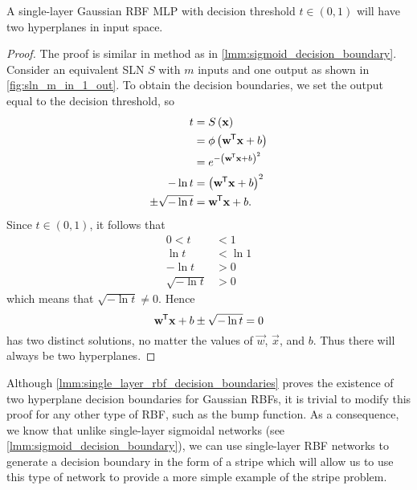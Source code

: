 \begin{lemma}
    \label{lmm:single_layer_rbf_decision_boundaries}
    A single-layer Gaussian RBF MLP with decision threshold $t\in (0,1)$ will have two hyperplanes in input space.
\end{lemma}
\begin{proof}
    The proof is similar in method as in \ref{lmm:sigmoid_decision_boundary}.
    Consider an equivalent SLN $S$ with $m$ inputs and one output as shown in \ref{fig:sln_m_in_1_out}. 
    To obtain the decision boundaries, we set the output equal to the decision threshold, so
    \begin{align*}
        t &= S\left(\mathbf{x}\right) \\
        &= \phi\left(\mathbf{w}^{\mkern-1.5mu\mathsf{T}} \mathbf{x} + b\right) \\
        &= e^{-\left(\mathbf{w}^{\mkern-1.5mu\mathsf{T}} \mathbf{x} + b \right)^2} \\
        -\ln{t} &= \left(\mathbf{w}^{\mkern-1.5mu\mathsf{T}} \mathbf{x} + b \right)^2 \\
        \pm \sqrt{-\ln{t}} &= \mathbf{w}^{\mkern-1.5mu\mathsf{T}} \mathbf{x} + b.
    \end{align*}
    Since $t\in (0,1)$, it follows that
    \begin{align*}
        0 < t &< 1 \\
        \ln t &< \ln 1 \\
        -\ln t &> 0 \\
        \sqrt{-\ln{t}} &> 0
    \end{align*}
    which means that $\sqrt{-\ln{t}} \neq 0$. 
    Hence
    \begin{equation}
        \label{eq:gaussian_hyperplanes}
        \mathbf{w}^{\mkern-1.5mu\mathsf{T}} \mathbf{x} + b \pm \sqrt{-\ln{t}} = 0
    \end{equation}
    has two distinct solutions, no matter the values of $\vec{w}$, $\vec{x}$, and $b$.
    Thus there will always be two hyperplanes.
\end{proof}
\begin{remark}
    Although \ref{lmm:single_layer_rbf_decision_boundaries} proves the existence of two hyperplane decision boundaries for Gaussian RBFs, it is trivial to modify this proof for any other type of RBF, such as the bump function.
    As a consequence, we know that unlike single-layer sigmoidal networks (see \ref{lmm:sigmoid_decision_boundary}), we can use single-layer RBF networks to generate a decision boundary in the form of a stripe which will allow us to use this type of network to provide a more simple example of the stripe problem.
\end{remark}

